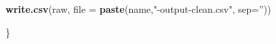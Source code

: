 \documentclass[]{elsarticle} %
\newenvironment{Shaded}{\begin{snugshade}}{\end{snugshade}}
\newcommand{\KeywordTok}[1]{\textcolor[rgb]{0.13,0.29,0.53}{\textbf{{#1}}}}
\newcommand{\DataTypeTok}[1]{\textcolor[rgb]{0.13,0.29,0.53}{{#1}}}
\newcommand{\StringTok}[1]{\textcolor[rgb]{0.31,0.60,0.02}{{#1}}}
\newcommand{\NormalTok}[1]{{#1}}
\begin{document}
\begin{Shaded}
\begin{Highlighting}[]
\KeywordTok{write.csv}\NormalTok{(raw, }\DataTypeTok{file =} \KeywordTok{paste}\NormalTok{(name,}\StringTok{"-output-clean.csv"}\NormalTok{, }\DataTypeTok{sep=}\StringTok{''}\NormalTok{))}

\NormalTok{\}}
\end{Highlighting}
\end{Shaded}
\end{document}
